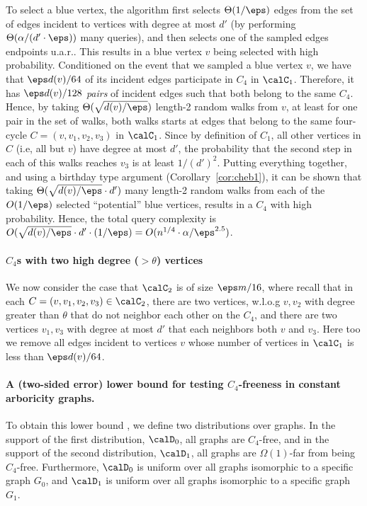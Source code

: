 To select a blue vertex, the algorithm first selects 
$\Theta(1/\eps)$ edges 
from the set of edges incident to vertices with degree at most $d'$ (by performing  $\Theta(\alpha/(d'\cdot \eps))$   many queries),   and then selects one of the sampled edges endpoints u.a.r.. This results in a blue vertex $v$ being selected with high probability. Conditioned on the event that we sampled a blue vertex $v$, we have that $\eps d(v)/64$ of its incident edges participate in $C_4$ in $\calC_1$. Therefore, it has $\eps d(v)/128$ \emph{pairs} of incident edges such that both belong to the same $C_4$. Hence, by taking $\Theta(\sqrt{d(v)/\eps})$  length-2 random walks from $v$, at least for one pair in the set of walks, both walks starts at edges that belong to the same four-cycle $C=(v, v_1, v_2, v_3)$ in $\calC_1$. Since by definition of $C_1$, all other vertices in $C$ (i.e, all but $v$) have degree at most $d'$, the probability that the second step in each of this walks reaches $v_3$ is at least $1/(d')^2$. Putting everything together, and using a birthday type argument (Corollary~\ref{cor:cheb1}), it can be shown that taking $\Theta(\sqrt{d(v)/\eps}\cdot d')$ many length-2 random walks from each of the $O(1/\eps)$ selected  ``potential'' blue vertices, results in a $C_4$ with high probability. Hence, the total query complexity is $O(\sqrt{d(v)/\eps}\cdot d'\cdot (1/\eps)=O(n^{1/4}\cdot \alpha/\eps^{2.5})$. 


\paragraph{$C_4$s with two high degree ($>\theta$) vertices}
We now consider the case that $\calC_2$ is of size $\eps m/16$, where recall that in each  $C=(v,v_1,v_2,v_3)\in \calC_2$, there are two vertices, w.l.o.g $v, v_2$ with
degree greater than $\theta$ that do not neighbor each other on the $C_4$, and there are two vertices $v_1,v_3$ with degree at most $d'$ that each neighbors both $v$ and $v_3$. Here too  we remove all edges incident to vertices $v$ whose number of vertices in $\calC_1$ is less than $\eps d(v)/64$.
\fi


\paragraph{A (two-sided error) lower bound for testing $C_4$-freeness in constant arboricity graphs.}
To obtain %
this lower bound ,
we define two distributions over graphs.
In the support of the first distribution, $\calD_0$, all graphs are $C_4$-free, and in the support of the second distribution, $\calD_1$, all graphs are $\Omega(1)$-far from being $C_4$-free. Furthermore, $\calD_0$ is uniform over all graphs isomorphic to a specific  graph $G_0$, and $\calD_1$ is uniform over all graphs isomorphic to a specific graph $G_1$.

